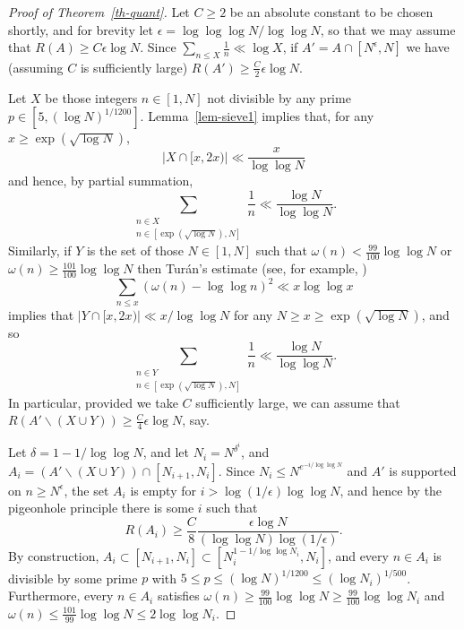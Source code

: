 \documentclass{amsart}
\newcommand{\abs}[1]{\left\lvert #1\right\rvert}
\begin{document}
\begin{proof}[Proof of Theorem~\ref{th-quant}]
Let $C\geq 2$ be an absolute constant to be chosen shortly, and for brevity let $\epsilon = \log\log\log N/\log\log N$, so that we may assume that $R(A)\geq C\epsilon \log N$. Since $\sum_{n\leq X}\frac{1}{n}\ll \log X$, if $A'=A\cap [N^\epsilon,N]$ we have (assuming $C$ is sufficiently large) $R(A')\geq \frac{C}{2}\epsilon\log N$. 

Let $X$ be those integers $n\in [1,N]$ not divisible by any prime $p\in [5,(\log N)^{1/1200}]$. Lemma~\ref{lem-sieve1} implies that, for any $x\geq \exp(\sqrt{\log N})$,  
\[\abs{X\cap[x,2x)}\ll \frac{x}{\log\log N}\]
and hence, by partial summation, 
\[\sum_{\substack{n\in X\\ n\in [\exp(\sqrt{\log N}),N]}}\frac{1}{n}\ll \frac{\log N}{\log\log N}.\]
Similarly, if $Y$ is the set of those $N\in [1,N]$ such that $\omega(n) <\frac{99}{100}\log\log N$ or $\omega(n)\geq \frac{101}{100}\log\log N$ then Tur\'{a}n's estimate (see, for example, \cite[Theorem 2.12]{MV})
\[\sum_{n\leq x}(\omega(n)-\log\log n)^2\ll x\log\log x\]
implies that $\abs{Y\cap [x,2x)}\ll x/\log\log N$ for any $N\geq x\geq \exp(\sqrt{\log N})$, and so
\[\sum_{\substack{n\in Y\\ n\in [\exp(\sqrt{\log N}),N]}}\frac{1}{n}\ll \frac{\log N}{\log\log N}.\]
In particular, provided we take $C$ sufficiently large, we can assume that $R(A'\backslash (X\cup Y))\geq \frac{C}{4}\epsilon \log N$, say. 

Let $\delta=1-1/\log\log N$, and let $N_i=N^{\delta^i}$, and $A_i=(A'\backslash (X\cup Y))\cap [N_{i+1},N_i]$. Since $N_i\leq N^{e^{-i/\log\log N}}$ and $A'$ is supported on $n\geq N^\epsilon$, the set $A_i$ is empty for $i> \log(1/\epsilon)\log\log N$, and hence by the pigeonhole principle there is some $i$ such that
\[R(A_i)\geq \frac{C}{8}\frac{\epsilon\log N}{(\log\log N)\log(1/\epsilon)}.\]
By construction, $A_i\subset [N_{i+1},N_i]\subset [N_i^{1-1/\log\log N_i},N_i]$, and every $n\in A_i$ is divisible by some prime $p$ with $5\leq p\leq (\log N)^{1/1200}\leq (\log N_i)^{1/500}$. Furthermore, every $n\in A_i$ satisfies $\omega(n)\geq \frac{99}{100}\log\log N\geq \frac{99}{100}\log\log N_i$ and $\omega(n)\leq \frac{101}{99}\log\log N\leq 2\log\log N_i$.


\end{proof}
\end{document}
